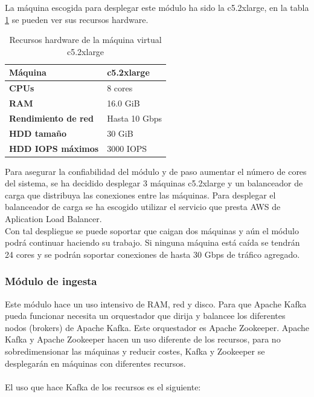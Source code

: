 La máquina escogida para desplegar este módulo ha sido la c5.2xlarge, en la tabla \ref{tabla:c5.2xlarge} se pueden ver sus recursos hardware.


\begin{table}[H]\label{tabla:c5.2xlarge}
	\centering
	\begin{tabular}{|l|l|}
		\hline
		\textbf{Máquina}            & \textbf{c5.2xlarge}    \\ \hline
		\textbf{CPUs}               & 8 cores                \\ \hline
		\textbf{RAM}                & 16.0 GiB               \\ \hline
		\textbf{Rendimiento de red} & Hasta 10 Gbps          \\ \hline
		\textbf{HDD tamaño}         & 30 GiB                 \\ \hline
		\textbf{HDD IOPS máximos}   & 3000 IOPS              \\ \hline
	\end{tabular}
	\caption{Recursos hardware de la máquina virtual c5.2xlarge}
\end{table}



Para asegurar la confiabilidad del módulo y de paso aumentar el número de cores del sistema, se ha decidido desplegar 3 máquinas c5.2xlarge y un balanceador de carga que distribuya las conexiones entre las máquinas. Para desplegar el balanceador de carga se ha escogido utilizar el servicio que presta AWS de Aplication Load Balancer\cite{Tfg:apploadbalancer}.
\\
Con tal despliegue se puede soportar que caigan dos máquinas y aún el módulo podrá continuar haciendo su trabajo. Si ninguna máquina está caída se tendrán 24 cores y se podrán soportar conexiones de hasta 30 Gbps de tráfico agregado.


\subsubsection{Módulo de ingesta}
Este módulo hace un uso intensivo de RAM, red y disco. Para que Apache Kafka pueda funcionar necesita un orquestador que dirija y balancee los diferentes nodos (brokers) de Apache Kafka. Este orquestador es Apache Zookeeper. Apache Kafka y Apache Zookeeper hacen un uso diferente de los recursos, para no sobredimensionar las máquinas y reducir costes, Kafka y Zookeeper se desplegarán en máquinas con diferentes recursos.
\\\\
El uso que hace Kafka de los recursos es el siguiente\cite{Tfg:kafkadeploy}:

